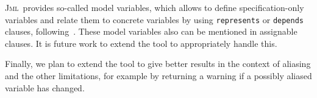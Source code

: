 \documentclass[a4paper]{llncs}
\newcommand{\jml}{\textsc{Jml}}
\begin{document}
\jml\ provides so-called model variables, which allows to define
specification-only variables and relate them to concrete variables by
using \texttt{represents} or \texttt{depends} clauses,
following~\cite{Leino98}. These model variables also can be mentioned
in assignable clauses. It is future work to extend the tool to
appropriately handle this.


Finally, we plan to extend the tool to give better results in the
context of aliasing and the other limitations, for example by
returning a warning if a possibly aliased variable has changed.



\end{document}
